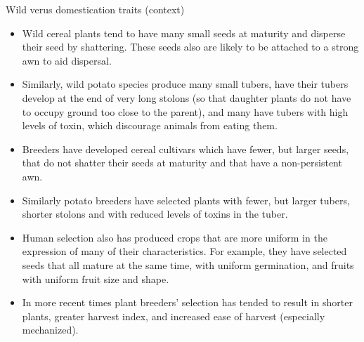 \documentclass[
  ignorenonframetext,
  aspectratio=169]{beamer}
\begin{document}
\begin{frame}{Wild verus domestication traits (context)}
\protect\hypertarget{wild-verus-domestication-traits-context}{}
\begin{itemize}
\item
  Wild cereal plants tend to have many small seeds at maturity and
  disperse their seed by shattering. These seeds also are likely to be
  attached to a strong awn to aid dispersal.
\item
  Similarly, wild potato species produce many small tubers, have their
  tubers develop at the end of very long stolons (so that daughter
  plants do not have to occupy ground too close to the parent), and many
  have tubers with high levels of toxin, which discourage animals from
  eating them.
\item
  Breeders have developed cereal cultivars which have fewer, but larger
  seeds, that do not shatter their seeds at maturity and that have a
  non-persistent awn.
\end{itemize}
\end{frame}

\begin{frame}{}
\protect\hypertarget{section-8}{}
\begin{itemize}
\item
  Similarly potato breeders have selected plants with fewer, but larger
  tubers, shorter stolons and with reduced levels of toxins in the
  tuber.
\item
  Human selection also has produced crops that are more uniform in the
  expression of many of their characteristics. For example, they have
  selected seeds that all mature at the same time, with uniform
  germination, and fruits with uniform fruit size and shape.
\item
  In more recent times plant breeders' selection has tended to result in
  shorter plants, greater harvest index, and increased ease of harvest
  (especially mechanized).
\end{itemize}
\end{frame}
\end{document}

